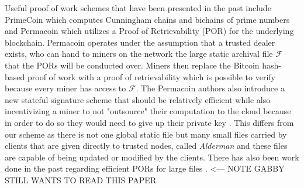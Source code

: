 \documentclass{article}
\begin{document}
Useful proof of work schemes that have been presented in the past include PrimeCoin which computes Cunningham chains and bichains of prime numbers \cite{primecoin} and Permacoin which utilizes a Proof of Retrievability (POR) for the underlying blockchain. Permacoin operates under the assumption that a trusted dealer exists, who can hand to miners on the network the large static archival file $\mathcal{F}$ that the PORs will be conducted over. Miners then replace the Bitcoin hash-based proof of work with a proof of retrievability which is possible to verify because every miner has access to $\mathcal{F}$. The Permacoin authors also introduce a new stateful signature scheme that should be relatively efficient while also incentivizing a miner to not "outsource" their computation to the cloud because in order to do so they would need to give up their private key \cite{perma}. This differs from our scheme as there is not one global static file but many small files carried by clients that are given directly to trusted nodes, called \emph{Alderman} and these files are capable of being updated or modified by the clients. There has also been work done in the past regarding efficient PORs for large files \cite{largefile}. <--- NOTE GABBY STILL WANTS TO READ THIS PAPER
\end{document}
